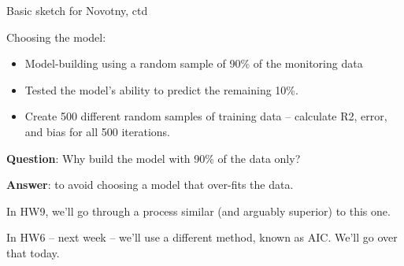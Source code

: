\documentclass[aspectratio=169]{beamer}
\begin{document}
\begin{frame}{Basic sketch for Novotny, ctd}

Choosing the model:
\begin{itemize}
\item Model-building using a random sample of 90\% of the monitoring data 
\item Tested the model's ability to predict the remaining 10\%. 
\item Create 500 different random samples of training data -- calculate R2, error, and bias for all 500 iterations. 
\end{itemize}

\textbf{Question}: Why build the model with 90\% of the data only?\pause

\vspace{5mm}
\textbf{Answer}: to avoid choosing a model that over-fits the data.

\vspace{5mm}
In HW9, we'll go through a process similar (and arguably superior) to this one.

\vspace{5mm}
In HW6 -- next week -- we'll use a different method, known as AIC.  We'll go over that today.  
\end{frame}
	
\end{document}
